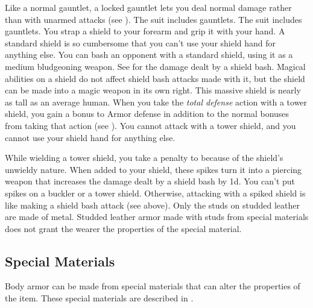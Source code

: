         Like a normal gauntlet, a locked gauntlet lets you deal normal damage rather than  with unarmed attacks (see ).
         The suit includes gauntlets.
         The suit includes gauntlets.
         You strap a shield to your forearm and grip it with your hand. A standard shield is so cumbersome that you can't use your shield hand for anything else.
         You can bash an opponent with a standard shield, using it as a medium bludgeoning weapon. See  for the damage dealt by a shield bash.
        Magical abilities on a shield do not affect shield bash attacks made with it, but the shield can be made into a magic weapon in its own right.
         This massive shield is nearly as tall as an average human.
        When you take the \textit{total defense} action with a tower shield, you gain a  bonus to Armor defense in addition to the normal bonuses from taking that action (see ).
        You cannot attack with a tower shield, and you cannot use your shield hand for anything else.

        While wielding a tower shield, you take a  penalty to  because of the shield's unwieldy nature.
         When added to your shield, these spikes turn it into a piercing weapon that increases the damage dealt by a shield bash by \plus1d. You can't put spikes on a buckler or a tower shield. Otherwise, attacking with a spiked shield is like making a shield bash attack (see above).
         Only the studs on studded leather are made of metal.
        Studded leather armor made with studs from special materials does not grant the wearer the properties of the special material.

    \subsection{Special Materials}\label{Special Materials}
        Body armor can be made from special materials that can alter the properties of the item.
        These special materials are described in .

